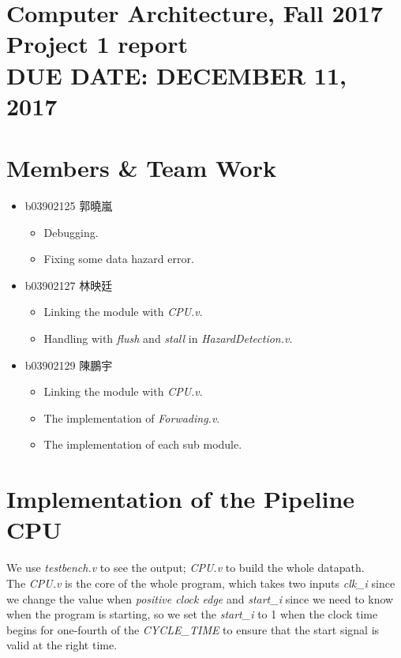 \documentclass{article}
\newcommand{\hmwkClass}{Computer Architecture, Fall 2017}
\newcommand{\hmwkTitle}{Project 1 report}
\newcommand{\hmwkDueDate}{DECEMBER 11, 2017}
\begin{document}
\thispagestyle{empty}
\section*{\hmwkClass \\
    \normalsize{\hmwkTitle} \\
    \normalsize{DUE DATE: \hmwkDueDate}
}

\section{Members \& Team Work} 
\begin{itemize}
    \item b03902125 郭曉嵐
    \begin{itemize}
        \item Debugging.
        \item Fixing some data hazard error.
    \end{itemize}

    \item b03902127 林映廷
    \begin{itemize}
        \item Linking the module with \textit{CPU.v}.
        \item Handling with \textit{flush} and \textit{stall} in \textit{HazardDetection.v}.
    \end{itemize}

    \item b03902129 陳鵬宇
    \begin{itemize}
        \item Linking the module with \textit{CPU.v}.
        \item The implementation of \textit{Forwading.v}.
        \item The implementation of each sub module.
    \end{itemize}

\end{itemize}

\section{Implementation of the Pipeline CPU}

We use \textit{testbench.v} to see the output; \textit{CPU.v} to build the whole datapath.\\

The \textit{CPU.v} is the core of the whole program, which takes two inputs \textit{clk\_i} since we change the value when \textit{positive clock edge} and \textit{start\_i} since we need to know when the program is starting, so we set the \textit{start\_i} to 1 when the clock time begins for one-fourth of the \textit{CYCLE\_TIME} to ensure that the start signal is valid at the right time. 
\end{document}
